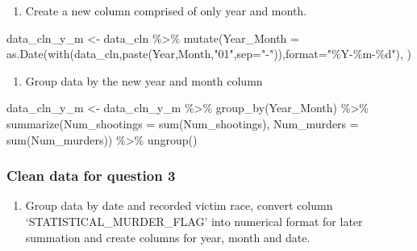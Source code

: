\documentclass[
]{article}
\newenvironment{Shaded}{\begin{snugshade}}{\end{snugshade}}
\newcommand{\AttributeTok}[1]{\textcolor[rgb]{0.77,0.63,0.00}{#1}}
\newcommand{\FunctionTok}[1]{\textcolor[rgb]{0.00,0.00,0.00}{#1}}
\newcommand{\NormalTok}[1]{#1}
\newcommand{\OtherTok}[1]{\textcolor[rgb]{0.56,0.35,0.01}{#1}}
\newcommand{\SpecialCharTok}[1]{\textcolor[rgb]{0.00,0.00,0.00}{#1}}
\newcommand{\StringTok}[1]{\textcolor[rgb]{0.31,0.60,0.02}{#1}}
\providecommand{\tightlist}{%
  \setlength{\itemsep}{0pt}\setlength{\parskip}{0pt}}
\begin{document}
\begin{enumerate}
\def\labelenumi{\arabic{enumi})}
\setcounter{enumi}{1}
\tightlist
\item
  Create a new column comprised of only year and month.
\end{enumerate}

\begin{Shaded}
\begin{Highlighting}[]
\NormalTok{data\_cln\_y\_m }\OtherTok{\textless{}{-}}\NormalTok{ data\_cln }\SpecialCharTok{\%\textgreater{}\%} \FunctionTok{mutate}\NormalTok{(}\AttributeTok{Year\_Month =} \FunctionTok{as.Date}\NormalTok{(}\FunctionTok{with}\NormalTok{(data\_cln,}\FunctionTok{paste}\NormalTok{(Year,Month,}\StringTok{"01"}\NormalTok{,}\AttributeTok{sep=}\StringTok{"{-}"}\NormalTok{)),}\AttributeTok{format=}\StringTok{"\%Y{-}\%m{-}\%d"}\NormalTok{), )}
\end{Highlighting}
\end{Shaded}

\begin{enumerate}
\def\labelenumi{\arabic{enumi})}
\setcounter{enumi}{2}
\tightlist
\item
  Group data by the new year and month column
\end{enumerate}

\begin{Shaded}
\begin{Highlighting}[]
\NormalTok{data\_cln\_y\_m }\OtherTok{\textless{}{-}}\NormalTok{ data\_cln\_y\_m }\SpecialCharTok{\%\textgreater{}\%} \FunctionTok{group\_by}\NormalTok{(Year\_Month) }\SpecialCharTok{\%\textgreater{}\%} \FunctionTok{summarize}\NormalTok{(}\AttributeTok{Num\_shootings =} \FunctionTok{sum}\NormalTok{(Num\_shootings), }\AttributeTok{Num\_murders =} \FunctionTok{sum}\NormalTok{(Num\_murders)) }\SpecialCharTok{\%\textgreater{}\%} \FunctionTok{ungroup}\NormalTok{()}
\end{Highlighting}
\end{Shaded}

\hypertarget{clean-data-for-question-3}{%
\subsubsection{Clean data for question
3}\label{clean-data-for-question-3}}

\begin{enumerate}
\def\labelenumi{\arabic{enumi})}
\tightlist
\item
  Group data by date and recorded victim race, convert column
  `STATISTICAL\_MURDER\_FLAG' into numerical format for later summation
  and create columns for year, month and date.
\end{enumerate}
\end{document}
